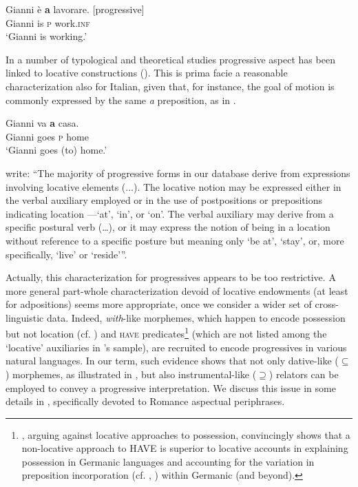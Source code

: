 \documentclass[output=paper,modfonts,nonflat,newtxmath,colorlinks,citecolor=brown]{langsci/langscibook}
\begin{document}
     \ex \label{ex:franco:10b}
    \gll Gianni è \textbf{a} lavorare.   \hfill [progressive]\\
        Gianni is \textsc{p} work.\textsc{inf}\\
    \glt ‘Gianni is working.’
    \z
    \z
  

In a number of typological and theoretical studies progressive aspect has been linked to locative constructions (\citealt{BybeeEtAl1994,MateuAmadas1999,DemirdacheUribe-Etxebarria1997}).  This is {prima facie} a reasonable characterization also for Italian, given that, for instance, the goal of motion is commonly expressed by the same \textit{a} preposition, as in . 

\ea%
    \label{ex:franco:11}
    \gll  Gianni va \textbf{a} casa.\\
         Gianni goes \textsc{p} home\\
    \glt ‘Gianni goes (to) home.’
    \z

\citet[129--130]{BybeeEtAl1994} write: “The majority of progressive forms in our database derive from expressions involving locative elements (...). The locative notion may be expressed either in the verbal auxiliary employed or in the use of postpositions or prepositions indicating location —‘at’, ‘in’, or ‘on’. The verbal auxiliary may derive from a specific postural verb (…), or it may express the notion of being in a location without reference to a specific posture but meaning only ‘be at’, ‘stay’, or, more specifically, ‘live’ or ‘reside’”.

Actually, this characterization for progressives appears to be too restrictive. A more general part-whole characterization devoid of locative endowments (at least for adpositions) seems more appropriate, once we consider a wider set of cross-linguistic data. Indeed, \textit{with}{}-like morphemes, which happen to encode possession but not location (cf. \citealt{Levinson2011}) and \textsc{have} predicates\footnote{\citet{Levinson2011}, arguing against locative approaches to possession, convincingly shows that a non-locative approach to HAVE is superior to locative accounts in explaining possession in Germanic languages and accounting for the variation in preposition incorporation (cf. \citealt{Kayne1993}, \citealt{Harley2002}) within Germanic (and beyond).} (which are not listed among the ‘locative’ auxiliaries in \citeauthor{BybeePerkinsPagliuca1994}’s sample), are recruited to encode progressives in various natural languages. In our term, such evidence shows that not only dative-like (${\subseteq}$) morphemes, as illustrated in , but also instrumental-like (${\supseteq}$) relators can be employed to convey a progressive interpretation. We discuss this issue in some details in , specifically devoted to Romance aspectual periphrases. 
\end{document}
